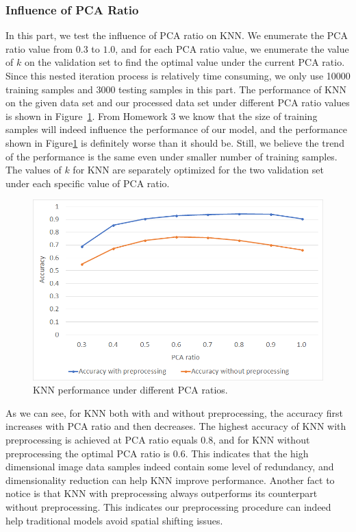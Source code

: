 \documentclass{article}
\begin{document}
\subsubsection{Influence of PCA Ratio}
In this part, we test the influence of PCA ratio on KNN. We enumerate the PCA ratio value from $0.3$ to $1.0$, and for each PCA ratio value, we enumerate the value of $k$ on the validation set to find the optimal value under the current PCA ratio. Since this nested iteration process is relatively time consuming, we only use 10000 training samples and 3000 testing samples in this part. The performance of KNN on the given data set and our processed data set under different PCA ratio values is shown in Figure~\ref{fig:KNN_PCA}. From Homework 3 we know that the size of training samples will indeed influence the performance of our model, and the performance shown in Figure\ref{fig:KNN_PCA} is definitely worse than it should be. Still, we believe the trend of the performance is the same even under smaller number of training samples. The values of $k$ for KNN are separately optimized for the two validation set under each specific value of PCA ratio. 


\begin{figure}[!htb]
	\centering\includegraphics[width=.8\textwidth]{fig/KNN_PCA}
	\caption{KNN performance under different PCA ratios.}\label{fig:KNN_PCA}
\end{figure}

As we can see, for KNN both with and without preprocessing, the accuracy first increases with PCA ratio and then decreases. The highest accuracy of KNN with preprocessing is achieved at PCA ratio equals 0.8, and for KNN without preprocessing the optimal PCA ratio is 0.6. This indicates that the high dimensional image data samples indeed contain some level of redundancy, and dimensionality reduction can help KNN improve performance. Another fact to notice is that KNN with preprocessing always outperforms its counterpart without preprocessing. This indicates our preprocessing procedure can indeed help traditional models avoid spatial shifting issues.
\end{document}
